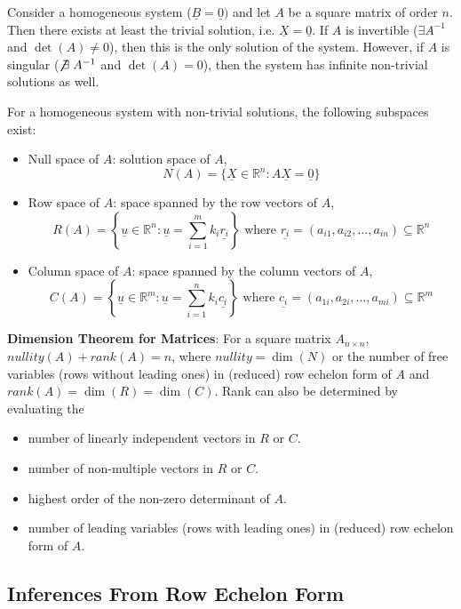 \documentclass{article}
\begin{document}
Consider a homogeneous system ($\underline{B} = \underline{0})$ and let $A$ be a square matrix of order $n$. Then there exists at least the trivial solution, i.e. $\underline{X} = \underline{0}$. If $A$ is invertible ($\exists A^{-1}$ and $\det(A) \not= 0$), then this is the only solution of the system. However, if $A$ is singular ($\centernot{\not\exists} A^{-1}$ and $\det(A) = 0$), then the system has infinite non-trivial solutions as well. 

For a homogeneous system with non-trivial solutions, the following subspaces exist:
\begin{itemize}
	\item Null space of $A$: solution space of $A$,
	$$N(A) = \{\underline{X} \in \mathbb{R}^n: A\underline{X} = \underline{0}\}$$
	\item Row space of $A$: space spanned by the row vectors of $A$,
	$$R(A) = \left\{\underline{u} \in \mathbb{R}^n: \underline{u} = \sum_{i=1}^{m} k_i\underline{r_i}\right\} \text{ where } \underline{r_i} = (a_{i1}, a_{i2}, \dots, a_{in}) \subseteq \mathbb{R}^n$$
	\item Column space of $A$: space spanned by the column vectors of $A$,
	$$C(A) = \left\{\underline{u} \in \mathbb{R}^m: \underline{u} = \sum_{i=1}^{n} k_i\underline{c_i}\right\} \text{ where } \underline{c_i} = (a_{1i}, a_{2i}, \dots, a_{mi}) \subseteq \mathbb{R}^m$$
\end{itemize}

\newpage

\textbf{Dimension Theorem for Matrices}: For a square matrix $A_{n \times n}$, $nullity(A) + rank(A) =  n$, where $nullity = \dim(N)$ or the number of free variables (rows without leading ones) in (reduced) row echelon form of $A$ and $rank(A) = \dim(R) = \dim(C)$. Rank can also be determined by evaluating the
\begin{itemize}
	\item number of linearly independent vectors in $R$ or $C$.
	\item number of non-multiple vectors in $R$ or $C$.
	\item highest order of the non-zero determinant of $A$.
	\item number of leading variables (rows with leading ones) in (reduced) row echelon form of $A$.
\end{itemize}

\subsection{Inferences From Row Echelon Form}
\end{document}
